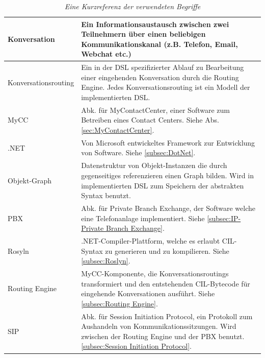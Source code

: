 \begin{table}[hbtp]
\begin{tabulary}{1.0\textwidth}{L|L}
Konversation & Ein Informationsaustausch zwischen zwei Teilnehmern über einen beliebigen Kommunikationskanal (z.B. Telefon, Email, Webchat etc.)\\

\hline

Konversationsrouting & Ein in der DSL spezifizierter Ablauf zu Bearbeitung einer eingehenden Konversation durch die Routing Engine. Jedes Konversationsrouting ist ein Modell der implementierten DSL.\\

\hline

MyCC & Abk. für MyContactCenter, einer Software zum Betreiben eines Contact Centers. Siehe Abs. \ref{sec:MyContactCenter}.\\

\hline

.NET & Von Microsoft entwickeltes Framework zur Entwicklung von Software. Siehe \ref{subsec:DotNet}.\\

\hline

Objekt-Graph & Datenstruktur von Objekt-Instanzen die durch gegenseitiges referenzieren einen Graph bilden. Wird in implementierten DSL zum Speichern der abstrakten Syntax benutzt.\\

\hline

PBX & Abk. für Private Branch Exchange, der Software welche eine Telefonanlage implementiert. Siehe \ref{subsec:IP-Private Branch Exchange}.\\

\hline

Rosyln & .NET-Compiler-Plattform, welche es erlaubt CIL-Syntax zu generieren und zu kompilieren. Siehe \ref{subsec:Roslyn}.\\

\hline

Routing Engine & MyCC-Komponente, die Konversationsroutings transformiert und den entstehenden CIL-Bytecode für eingehende Konversationen ausführt. Siehe \ref{subsec:Routing Engine}.\\

\hline
SIP & Abk. für Session Initiation Protocol, ein Protokoll zum Aushandeln von Kommunikationssitzungen. Wird zwischen der Routing Engine und der PBX benutzt. \ref{subsec:Session Initiation Protocol}.  \\

\end{tabulary}
\caption{\textit{Eine Kurzreferenz der verwendeten Begriffe}}
\label{tab:kurzreferenz}
\end{table}


